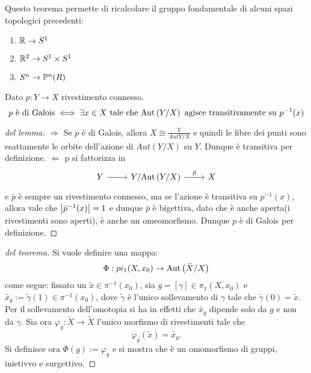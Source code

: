 \documentclass[]{article}
\begin{document}
\begin{remark} \nl
    Questo teorema permette di ricalcolare il gruppo fondamentale di alcuni spazi topologici precedenti:
    \begin{enumerate}
        \item $\R \to \Sph{1}$ \nl
        \item $\R^2 \to \Sph{1} \times \Sph{1}$ \nl
        \item $\Sph{n} \to \Proj{R}{n}$
    \end{enumerate}
\end{remark}

\begin{lemma}  \nl
    Dato $p: Y \to X$ rivestimento connesso. \nl
    \[
        p \text{ \`e di Galois} \iff \exists x \in X \tc \Aut{Y/X} \text{ agisce transitivamente su } p^{-1}(x)
    \]
\end{lemma}

\begin{proof} [del lemma]\nl
    $\Rightarrow$ Se $p$ \`e di Galois, allora $X \cong \frac{Y}{Aut{Y/X}}$ e quindi le fibre dei punti
    sono esattamente le orbite dell'azione di $Aut{(Y/X)}$ su $Y$. Dunque \`e transitiva per definizione. \nl
    $\Leftarrow$ p si fattorizza in
    \[\begin{tikzcd}
    Y & {Y/\Aut{Y/X}} & X
    \arrow["", from=1-1, to=1-2]
    \arrow["{\bar{p}}", from=1-2, to=1-3]
    \end{tikzcd}\]
    e $\bar{p}$ \`e sempre un rivestimento connesso, ma se l'azione \`e transitiva su $p^{-1}(x)$, allora
    vale che $\abs{\bar{p}^{-1}(x)} = 1$ e dunque $\bar{p}$ \`e bigettiva, dato che \`e anche aperta(i rivestimenti sono aperti), \`e anche un omeomorfismo. \nl
    Dunque $p$ \`e di Galois per definizione.
\end{proof}

\begin{proof} [del teorema] \nl
    Si vuole definire una mappa:
    \[
        \Phi: pi_1(X, x_0) \to \Aut{\tilde{X}/X}
    \]
    come segue: fissato un $\tilde{x} \in \pi^{-1}(x_0)$, sia $g = [\gamma] \in \pi_1(X, x_0)$ e $\tilde{x_g} := \tilde{\gamma}(1) \in \pi^{-1}(x_0)$, dove
    $\tilde{\gamma}$ \`e l'unico sollevamento di $\gamma$ tale che $\tilde{\gamma}(0) = \tilde{x}$. \nl
    Per il sollevamento dell'omotopia si ha in effetti che $\tilde{x_g}$ dipende solo da $g$ e non da $\gamma$. \nl
    Sia ora $\varphi_g: \tilde{X} \to \tilde{X}$ l'unico morfismo di rivestimenti tale che
    \[
        \varphi_g(\tilde{x}) = \tilde{x_g}.
    \]
    Si definisce ora $\Phi(g) := \varphi_g$ e si mostra che \`e un omomorfismo di gruppi, inietivvo e surgettivo. \nl

\end{proof}
\end{document}

